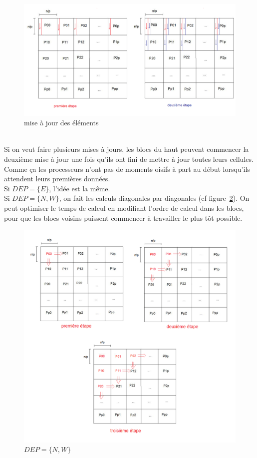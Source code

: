 \documentclass[a4paper,11pt]{article}
\begin{document}
\begin{figure}[!h]
\includegraphics[scale=0.4]{etapes.png}
\caption{mise à jour des éléments}
\label{etapes}
\end{figure}
\\
Si on veut faire plusieurs mises à jours, les blocs du haut peuvent commencer la deuxième mise à jour une fois qu'ils ont fini de mettre à jour toutes leurs cellules. Comme ça les processeurs n'ont pas de moments oisifs à part au début lorsqu'ils attendent leurs premières données.\\
Si $DEP = \{E\}$, l'idée est la même.\\
Si $DEP = \{N,W\}$, on fait les calculs diagonales par diagonales (cf figure~\ref{diagonales}).
On peut optimiser le temps de calcul en modifiant l'ordre de calcul dans les blocs, pour que les blocs voisins puissent commencer à travailler le plus tôt possible.
\begin{figure}[!h]
\includegraphics[scale=0.4]{diagonales.png}
\caption{$DEP = \{N,W\}$}
\label{diagonales}
\end{figure}
\end{document}
